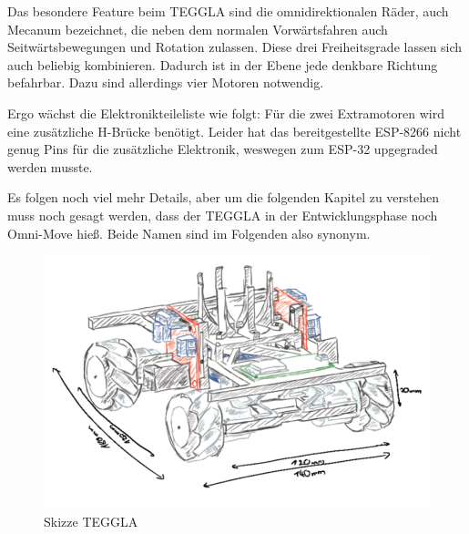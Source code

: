 Das besondere Feature beim TEGGLA sind die omnidirektionalen Räder, auch Mecanum bezeichnet, die neben dem normalen Vorwärtsfahren auch Seitwärtsbewegungen und Rotation zulassen. 
Diese drei Freiheitsgrade lassen sich auch beliebig kombinieren. 
Dadurch ist in der Ebene jede denkbare Richtung befahrbar. Dazu sind allerdings vier Motoren notwendig. 

Ergo wächst die Elektronikteileliste wie folgt: Für die zwei Extramotoren wird eine zusätzliche H-Brücke benötigt. 
Leider hat das bereitgestellte ESP-8266 nicht genug Pins für die zusätzliche Elektronik, weswegen zum ESP-32 upgegraded werden musste. 

Es folgen noch viel mehr Details, aber um die folgenden Kapitel zu verstehen muss noch gesagt werden, dass der TEGGLA in der Entwicklungsphase noch Omni-Move hieß. Beide Namen sind im Folgenden also synonym. 

\begin{figure}[!ht]
	\centering
	\includegraphics[width=\textwidth]{bilder/tegglaskizze.png}
	\caption{Skizze TEGGLA}
	\label{bild:tegglaskizze}
\end{figure}


